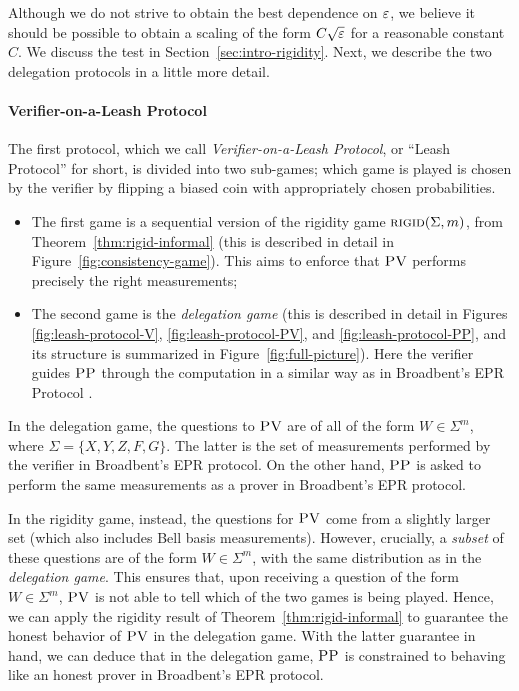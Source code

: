 Although we do not strive to obtain the best dependence on $\varepsilon$, we believe it
should be possible to obtain a scaling of the form $C\sqrt{\varepsilon}$ for a
reasonable constant~$C$. We discuss the test in Section~\ref{sec:intro-rigidity}. %
Next, we describe the two delegation protocols in a little more detail.

\paragraph{Verifier-on-a-Leash Protocol}
The first protocol, which we call \emph{Verifier-on-a-Leash
Protocol}, or ``Leash Protocol'' for short, is divided into two sub-games; which game is played is chosen by the verifier by flipping a biased coin with appropriately chosen probabilities.
\begin{itemize}[nolistsep]
\item The first game is a sequential version of the rigidity game $\textsc{rigid}(\Sigma,m)$, from Theorem~\ref{thm:rigid-informal} (this is described in detail in Figure~\ref{fig:consistency-game}). This aims to enforce that $\textsc{PV}$ performs precisely the right measurements;
\item The second game is the \emph{delegation game} (this is described in detail in Figures \ref{fig:leash-protocol-V}, \ref{fig:leash-protocol-PV}, and \ref{fig:leash-protocol-PP}, and its structure is summarized in Figure~\ref{fig:full-picture}). Here the verifier guides $\textsc{PP}$ through the computation in a similar way as in Broadbent's EPR Protocol \cite{broadbent15howtoverify}.
\end{itemize}

In the delegation game, the questions to $\textsc{PV}$ are of all of the form $W\in \Sigma^m$, where $\Sigma = \{X,Y,Z,F,G\}$. The latter is the set of measurements performed by the verifier in Broadbent's EPR protocol. On the other hand, $\textsc{PP}$ is asked to perform the same measurements as a prover in Broadbent's EPR protocol.

In the rigidity game, instead, the questions for $\textsc{PV}$ come from a slightly larger set (which also includes Bell basis measurements). However, crucially, a \emph{subset} of these questions are of the form $W\in \Sigma^m$, with the same distribution as in the \emph{delegation game}. This ensures that, upon receiving a question of the form $W\in \Sigma^m$, $\textsc{PV}$ is not able to tell which of the two games is being played. Hence, we can apply the rigidity result of Theorem~\ref{thm:rigid-informal} to guarantee the honest behavior of $\textsc{PV}$ in the delegation game. With the latter guarantee in hand, we can deduce that in the delegation game, $\textsc{PP}$ is constrained to behaving like an honest prover in Broadbent's EPR protocol.

